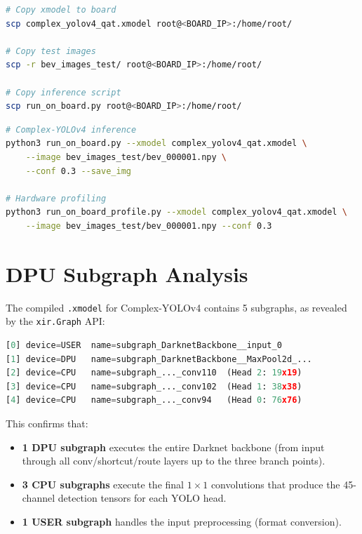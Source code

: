 \documentclass[12pt, a4paper]{report}
\begin{document}
\begin{lstlisting}[language=bash, caption={Transferring files to the ZCU104 board}]
# Copy xmodel to board
scp complex_yolov4_qat.xmodel root@<BOARD_IP>:/home/root/

# Copy test images
scp -r bev_images_test/ root@<BOARD_IP>:/home/root/

# Copy inference script
scp run_on_board.py root@<BOARD_IP>:/home/root/
\end{lstlisting}

\begin{lstlisting}[language=bash, caption={Running inference on the ZCU104}]
# Complex-YOLOv4 inference
python3 run_on_board.py --xmodel complex_yolov4_qat.xmodel \
    --image bev_images_test/bev_000001.npy \
    --conf 0.3 --save_img

# Hardware profiling
python3 run_on_board_profile.py --xmodel complex_yolov4_qat.xmodel \
    --image bev_images_test/bev_000001.npy --conf 0.3
\end{lstlisting}


\chapter{DPU Subgraph Analysis}

The compiled \texttt{.xmodel} for Complex-YOLOv4 contains 5 subgraphs, as revealed by the \texttt{xir.Graph} API:

\begin{lstlisting}[language=Python, caption={DPU subgraph inspection output}]
[0] device=USER  name=subgraph_DarknetBackbone__input_0
[1] device=DPU   name=subgraph_DarknetBackbone__MaxPool2d_...
[2] device=CPU   name=subgraph_..._conv110  (Head 2: 19x19)
[3] device=CPU   name=subgraph_..._conv102  (Head 1: 38x38)
[4] device=CPU   name=subgraph_..._conv94   (Head 0: 76x76)
\end{lstlisting}

This confirms that:
\begin{itemize}[nosep]
    \item \textbf{1 DPU subgraph} executes the entire Darknet backbone (from input through all conv/shortcut/route layers up to the three branch points).
    \item \textbf{3 CPU subgraphs} execute the final $1\times1$ convolutions that produce the 45-channel detection tensors for each YOLO head.
    \item \textbf{1 USER subgraph} handles the input preprocessing (format conversion).
\end{itemize}
\end{document}
